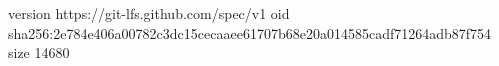 version https://git-lfs.github.com/spec/v1
oid sha256:2e784e406a00782c3dc15cecaaee61707b68e20a014585cadf71264adb87f754
size 14680
